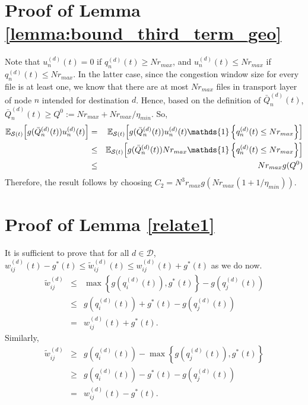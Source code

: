 \documentclass[10pt,onecolumn,draftclsnofoot,journal]{IEEEtran}
\newcommand{\mD} {\mathcal{D}}
\newcommand{\ben}{\begin{eqnarray*}}
\newcommand{\een}{\end{eqnarray*}}
\newcommand{\expectS}[1]{{\mathbb E_{\mathcal{S}(t)}} \Bigl[ #1\Bigr]}
\begin{document}
\section{Proof of Lemma \ref{lemma:bound_third_term_geo}}
Note that $u^{(d)}_n(t)=0$ if $q_n^{(d)}(t) \geq N r_{max}$, and $u^{(d)}_n(t) \leq Nr_{max}$ if $q_n^{(d)}(t) \leq N r_{max}$. In the latter case, since the congestion window size for every file is at least one, we know that there are at most $Nr_{max}$ files in transport layer of node $n$ intended for destination $d$. Hence, based on the definition of $\bar{Q}^{(d)}_n(t)$, $\bar{Q}^{(d)}_n(t) \ge Q^0 := Nr_{max}+ Nr_{max}/{\eta_{min}}$. So,
\begin{eqnarray*}
\expectS{g(\bar{Q}_n^{(d)}(t))u_n^{(d)}(t)}&=& \expectS{g(\bar{Q}_n^{(d)}(t))u_n^{(d)}(t)\mathds{1}\left\{q_n^{(d)}(t) \leq N r_{max}\right\}}  \\
&\leq& \expectS{g(\bar{Q}_n^{(d)}(t))Nr_{max} \mathds{1}\left\{q_n^{(d)}(t) \leq N r_{max}\right\} }  \\
&\leq&  Nr_{max}g(Q^0)
\end{eqnarray*}
Therefore, the result follows by choosing $C_2=N^3r_{max} g(Nr_{max}(1+ 1/\eta_{min})).$
\section{Proof of Lemma \ref{relate1}}
It is sufficient to prove that for all $d \in \mD$, $w^{(d)}_{ij}(t)-g^*(t) \leq \tilde{w}^{(d)}_{ij}(t) \leq w^{(d)}_{ij}(t)+g^*(t)$ as we do now.
\ben
\tilde{w}^{(d)}_{ij} &\leq& \max \left\{g\left(q_i^{(d)}(t)\right),g^*(t)\right\}-g\left(q_j^{(d)}(t)\right)\\
&\leq & g\left(q_i^{(d)}(t)\right)+ g^*(t) -g\left(q_j^{(d)}(t)\right)\\
& = & w_{ij}^{(d)}(t)+g^*(t).
\een
Similarly,
\ben
\tilde{w}^{(d)}_{ij} &\geq& g\left(q_i^{(d)}(t)\right)-\max \left\{g\left(q_j^{(d)}(t)\right),g^*(t)\right\}\\
&\geq & g\left(q_i^{(d)}(t)\right)- g^*(t) -g\left(q_j^{(d)}(t)\right)\\
& = & w_{ij}^{(d)}(t)-g^*(t).
\een
\end{document}
